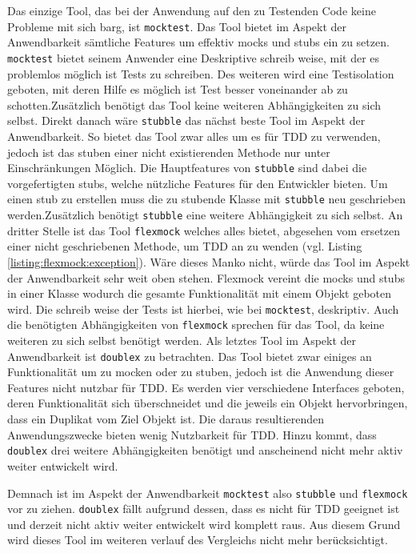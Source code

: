Das einzige Tool, das bei der Anwendung auf den zu Testenden Code keine
Probleme mit sich barg, ist \lstinline{mocktest}. Das Tool bietet im Aspekt der
Anwendbarkeit sämtliche Features um effektiv \Glspl{mock} und \Glspl{stub} ein
zu setzen. \lstinline{mocktest} bietet seinem Anwender eine Deskriptive schreib
weise, mit der es problemlos möglich ist Tests zu schreiben. Des weiteren wird
eine Testisolation geboten, mit deren Hilfe es möglich ist Test besser
voneinander ab zu schotten.Zusätzlich benötigt das Tool keine weiteren
Abhängigkeiten zu sich selbst.
Direkt danach wäre \lstinline{stubble} das  nächst beste Tool im Aspekt der
Anwendbarkeit. So bietet das Tool zwar alles um  es für TDD zu verwenden,
jedoch ist das \gls{stub}en einer nicht existierenden Methode nur unter
Einschränkungen Möglich. Die Hauptfeatures von \lstinline{stubble} sind dabei
die vorgefertigten \Glspl{stub}, welche nützliche Features für den Entwickler
bieten. Um einen \Gls{stub} zu erstellen muss die zu \gls{stub}ende Klasse mit
\lstinline{stubble} neu geschrieben werden.Zusätzlich benötigt
\lstinline{stubble} eine weitere Abhängigkeit zu sich selbst.
An dritter Stelle ist das Tool \lstinline{flexmock} welches alles bietet,
abgesehen vom ersetzen einer nicht geschriebenen Methode, um TDD an zu wenden
(vgl. Listing \ref{listing:flexmock:exception}). Wäre dieses Manko nicht, würde
das Tool im Aspekt der Anwendbarkeit sehr weit oben stehen. Flexmock vereint
die \Glspl{mock} und \Glspl{stub} in einer Klasse wodurch die gesamte
Funktionalität mit einem Objekt geboten wird. Die schreib weise der Tests ist
hierbei, wie bei \lstinline{mocktest}, deskriptiv. Auch die benötigten
Abhängigkeiten von \lstinline{flexmock} sprechen für das Tool, da keine
weiteren zu sich selbst benötigt werden. Als letztes Tool im Aspekt der
Anwendbarkeit ist \lstinline{doublex} zu betrachten. Das Tool bietet zwar
einiges an Funktionalität um zu \gls{mock}en oder zu \gls{stub}en, jedoch ist
die Anwendung dieser Features nicht nutzbar für TDD. Es werden vier
verschiedene Interfaces geboten, deren Funktionalität sich überschneidet und
die jeweils ein Objekt hervorbringen, dass ein Duplikat vom Ziel Objekt ist.
Die daraus resultierenden Anwendungszwecke bieten wenig Nutzbarkeit für TDD.
Hinzu kommt, dass \lstinline{doublex} drei weitere Abhängigkeiten benötigt und
anscheinend nicht mehr aktiv weiter entwickelt wird.

Demnach ist im Aspekt der Anwendbarkeit \lstinline{mocktest} also
\lstinline{stubble} und \lstinline{flexmock} vor zu ziehen. \lstinline{doublex}
fällt aufgrund dessen, dass es nicht für TDD geeignet ist und derzeit nicht
aktiv weiter entwickelt wird komplett raus. Aus diesem Grund wird dieses Tool
im weiteren verlauf des Vergleichs nicht mehr berücksichtigt.
\newline

